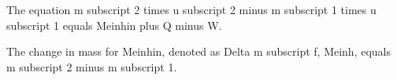 The equation m subscript 2 times u subscript 2 minus m subscript 1 times u subscript 1 equals Meinhin plus Q minus W.

The change in mass for Meinhin, denoted as Delta m subscript f, Meinh, equals m subscript 2 minus m subscript 1.